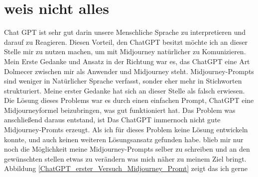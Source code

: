 \section{weis nicht alles}
Chat GPT ist sehr gut darin unsere Menschliche Sprache zu interpretieren und darauf zu Reagieren. Diesen Vorteil, den ChatGPT besitzt möchte ich an dieser Stelle mir zu nutzen machen, um mit Midjourney natürlicher zu Komunizieren.
Mein Erste Gedanke und Ansatz in der Richtung war es, das ChatGPT eine Art Dolmecer zwischen mir als Anwender und Midjourney steht.
Midjourney-Prompts sind weniger in Natürlicher Sprache verfasst, sonder eher mehr in Stichworten strukturiert.
Meine erster Gedanke hat sich an dieser Stelle als falsch erwiesen. Die Lösung dieses Problems war es durch einen einfachen Prompt, ChatGPT eine Midjourneyformel beizubringen, was gut funktioniert hat.
Das Problem was anschließend daraus entstand, ist Das ChatGPT immernoch nicht gute Midjourney-Promts erzeugt.
Als ich für dieses Problem keine Lösung entwickeln konnte, und auch keinen weiteren Lösungsansatz gefunden habe. blieb mir nur noch die Möglichkeit meine Midjourney-Prompts selber zu schreiben und an den gewünschten stellen etwas zu verändern was mich näher zu meinem Ziel bringt.
Abbildung \ref{ChatGPT_erster_Versuch_Midjourney_Promt} zeigt das ich gerne

